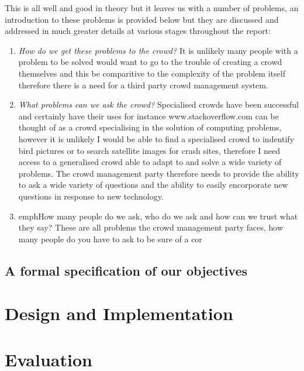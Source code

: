 \documentclass[11pt]{article}
\begin{document}
This is all well and good in theory but it leaves us with a number of problems, an introduction to these problems is provided below but
they are discussed and addressed in much greater details at various stages throughout the report:
\begin{enumerate}
\item
\emph{How do we get these problems to the crowd?} It is unlikely many people with a problem to be solved would want to go to the trouble
of creating a crowd themselves and this be comparitive to the complexity of the problem itself therefore there is a need for a third party
crowd management system. 
\item
\emph{What problems can we ask the crowd?} Specialised crowds have been successful and certainly have their uses for instance
www.stackoverflow.com can be thought of as a crowd specialising in the solution of computing problems, however it is unlikely I would
be able to find a specialised crowd to indentify bird pictures or to search satellite images for crash sites, therefore I need access 
to a generalised crowd able to adapt to and solve a wide variety of problems. The crowd management party therefore needs to provide
the ability to ask a wide variety of questions and the ability to easily encorporate new questions in response to new technology. %
\item
emph{How many people do we ask, who do we ask and how can we trust what they say?} These are all problems the crowd management
party faces, how many people do you have to ask to be sure of a cor 


\end{enumerate}
\subsection{A formal specification of our objectives}

\section{Design and Implementation}
 
\section{Evaluation}
\end{document}
